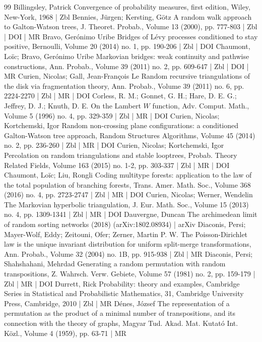 \documentclass[10pt]{amsart}
\theoremstyle{definition}\newtheorem{defi}[theo]{Definition}\newtheorem{rema}[theo]{Remark}\newtheorem{exam}[theo]{Example}\newtheorem{exem}[theo]{Example}\newtheorem{nota}[theo]{Notation}
\begin{document}
\begin{thebibliography}{99}
Billingsley, Patrick Convergence of probability measures, first edition, Wiley, New-York, 1968 | Zbl
Bennies, Jürgen; Kersting, Götz A random walk approach to Galton-Watson trees, J. Theoret. Probab., Volume 13 (2000), pp. 777-803 | Zbl | DOI | MR
Bravo, Gerónimo Uribe Bridges of Lévy processes conditioned to stay positive, Bernoulli, Volume 20 (2014) no. 1, pp. 190-206 | Zbl | DOI
Chaumont, Loïc; Bravo, Gerónimo Uribe Markovian bridges: weak continuity and pathwise constructions, Ann. Probab., Volume 39 (2011) no. 2, pp. 609-647 | Zbl | DOI | MR
Curien, Nicolas; Gall, Jean-François Le Random recursive triangulations of the disk via fragmentation theory, Ann. Probab., Volume 39 (2011) no. 6, pp. 2224-2270 | Zbl | MR | DOI
Corless, R. M.; Gonnet, G. H.; Hare, D. E. G.; Jeffrey, D. J.; Knuth, D. E. On the Lambert $W$ function, Adv. Comput. Math., Volume 5 (1996) no. 4, pp. 329-359 | Zbl | MR | DOI
Curien, Nicolas; Kortchemski, Igor Random non-crossing plane configurations: a conditioned Galton-Watson tree approach, Random Structures Algorithms, Volume 45 (2014) no. 2, pp. 236-260 | Zbl | MR | DOI
Curien, Nicolas; Kortchemski, Igor Percolation on random triangulations and stable looptrees, Probab. Theory Related Fields, Volume 163 (2015) no. 1-2, pp. 303-337 | Zbl | MR | DOI
Chaumont, Loïc; Liu, Rongli Coding multitype forests: application to the law of the total population of branching forests, Trans. Amer. Math. Soc., Volume 368 (2016) no. 4, pp. 2723-2747 | Zbl | MR | DOI
Curien, Nicolas; Werner, Wendelin The Markovian hyperbolic triangulation, J. Eur. Math. Soc., Volume 15 (2013) no. 4, pp. 1309-1341 | Zbl | MR | DOI
Dauvergne, Duncan The archimedean limit of random sorting networks (2018) (arXiv:1802.08934) | arXiv
Diaconis, Persi; Mayer-Wolf, Eddy; Zeitouni, Ofer; Zerner, Martin P. W. The Poisson-Dirichlet law is the unique invariant distribution for uniform split-merge transformations, Ann. Probab., Volume 32 (2004) no. 1B, pp. 915-938 | Zbl | MR
Diaconis, Persi; Shahshahani, Mehrdad Generating a random permutation with random transpositions, Z. Wahrsch. Verw. Gebiete, Volume 57 (1981) no. 2, pp. 159-179 | Zbl | MR | DOI
Durrett, Rick Probability: theory and examples, Cambridge Series in Statistical and Probabilistic Mathematics, 31, Cambridge University Press, Cambridge, 2010 | Zbl | MR
Dénes, József The representation of a permutation as the product of a minimal number of transpositions, and its connection with the theory of graphs, Magyar Tud. Akad. Mat. Kutató Int. Közl., Volume 4 (1959), pp. 63-71 | MR

\end{thebibliography}
\end{document}
